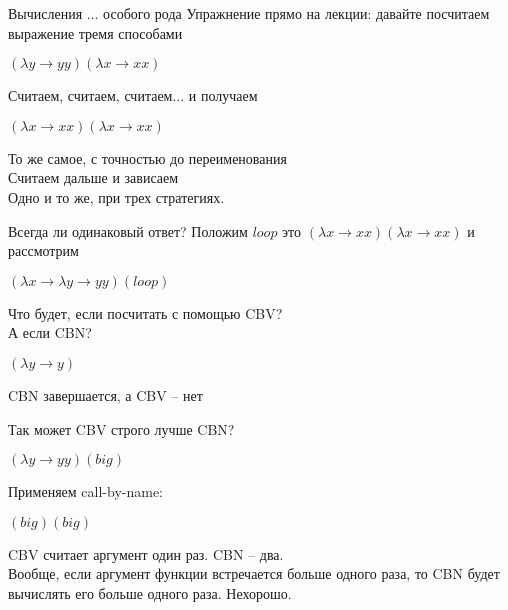 \documentclass[
  xcolor={svgnames},
  hyperref={colorlinks,citecolor=DeepPink4,linkcolor=DarkRed,urlcolor=DarkBlue}]{beamer}
\begin{document}
\begin{frame}[fragile]{Вычисления ... особого рода}
Упражнение прямо на лекции: давайте посчитаем выражение тремя способами\\
\begin{center}
 $(\lambda y \rightarrow y y) (\lambda x \rightarrow x x)$
\end{center}
\pause
Считаем, считаем, считаем... и получаем
\begin{center}
 $(\lambda x \rightarrow x x) (\lambda x \rightarrow x x)$
\end{center}
То же самое, с точностью до переименования\\
Считаем дальше и зависаем\\
\vspace{1cm}
Одно и то же, при трех стратегиях.
\end{frame}

\begin{frame}[fragile]{Всегда ли одинаковый ответ?}
Положим $loop$ это $(\lambda x \rightarrow x x) (\lambda x \rightarrow x x)$ и рассмотрим
\begin{center}
 $(\lambda x \rightarrow\lambda y \rightarrow y y) (loop)$
\end{center}\pause
{\Large \faQuestion} Что будет, если посчитать с помощью CBV?\pause \\
{\Large \faQuestion} А если CBN?\pause
\begin{center}
 $(\lambda y \rightarrow y)$
\end{center}
CBN завершается, а CBV -- нет
\end{frame}

\begin{frame}[fragile]{Так может CBV строго лучше CBN?}
\begin{center}
 $(\lambda y \rightarrow y y) (big)$
\end{center}
Применяем call-by-name:\pause
\begin{center}
 $(big)(big)$
\end{center}\pause
CBV считает аргумент один раз. CBN -- два. \\
\vspace{1cm}
Вообще, если аргумент функции встречается больше одного раза, то CBN будет вычислять его больше одного раза. Нехорошо.
\end{frame}
\end{document}
